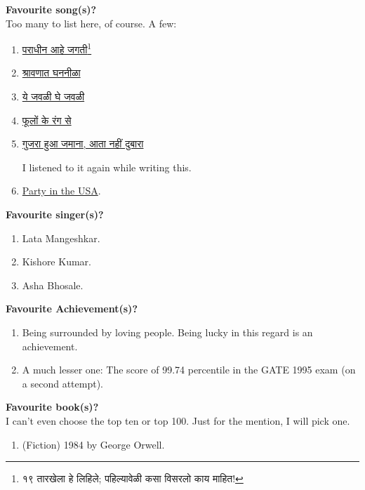 \documentclass[17pt]{extarticle}  %
\begin{document}
\begin{enumerate}
\begin{english}
\item
\textbf{Favourite song(s)?}\\
Too many to list here, of course. A few:
\begin{enumerate}
\item \begin{marathi}\href{https://youtu.be/qc-Nj-39BJ4?si=f-JNw4ILa6B5vHVd&t=60}{पराधीन आहे जगती\footnote{१९ तारखेला हे लिहिले; पहिल्यावेळी कसा विसरलो काय माहित!}}\end{marathi}
\item \begin{marathi}\href{https://youtu.be/I9Ehun8Ahk4?si=mRLlBz0B9LF-880y}{श्रावणात घननीळा}\end{marathi}
\item\begin{marathi}\href{https://youtu.be/QjCdcO4t1qI?si=HYx-DluK-yfos_GU}{ये जवळी घे जवळी}\end{marathi}
\item \begin{marathi}\href{https://youtu.be/4CwFFWleNNA?si=ZL-2KpfQ4d7v4GRL}{फूलों के रंग से}\end{marathi}
\item \begin{marathi}\href{https://youtu.be/I2RefAyeVRA?si=RrVtDNg5ekkHvkSH}{गुजरा हुआ जमाना, आता नहीं दुबारा} \end{marathi} I listened to it again while writing this.
\item \href{https://youtu.be/M11SvDtPBhA?si=2zDFraxrFgbzlw7y}{Party in the USA}.
\end{enumerate}

\item \textbf{Favourite singer(s)?}\\
\begin{enumerate}
\item Lata Mangeshkar.
\item Kishore Kumar.
\item Asha Bhosale.
\end{enumerate}

\item \textbf{Favourite Achievement(s)?}\\
\begin{enumerate}
\item Being surrounded by loving people. Being lucky in this regard is an achievement.
\item A much lesser one: The score of 99.74 percentile in the GATE 1995 exam (on a second attempt).
\end{enumerate}
\item \textbf{Favourite book(s)?}\\
I can't even choose the top ten or top 100. Just for the mention, I will pick one.
\begin{enumerate}
\item (Fiction) 1984 by George Orwell.
\end{enumerate}


\end{english}
\end{enumerate}
\end{document}
